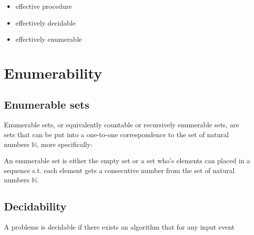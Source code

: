 




\begin{itemize}

\item effective procedure

\item effectively decidable

\item effectively enumerable

\end{itemize}


\section{Enumerability}

\subsection{Enumerable sets}

Enumerable sets, or equivalently countable or recursively enumerable sets, are
sets that can be put into a one-to-one correspondence to the set of natural
numbers $\mathbb{N}$, more specifically:

\begin{definition} An enumerable set is either the empty set or a set who's
elements can placed in a sequence s.t. each element gets a consecutive number
from the set of natural numbers $\mathbb{N}$.\end{definition}

\subsection{Decidability}

\begin{definition} A problems is decidable if there exists an algorithm that for any input event
\end{definition}

